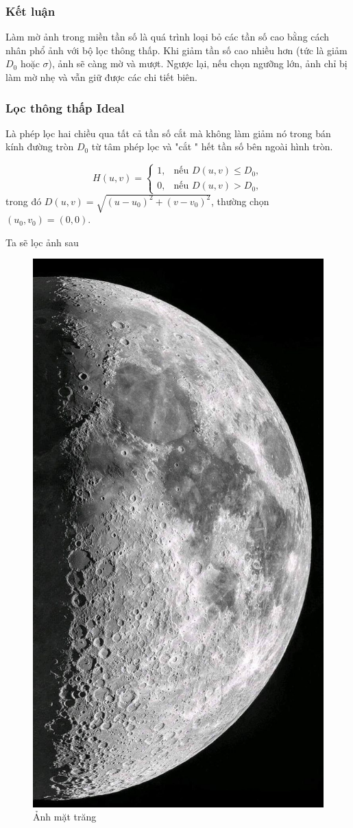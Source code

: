 \documentclass[12pt,a4paper]{report}
\numberwithin{equation}{section}
\theoremstyle{definition} %
\begin{document}
\subsubsection*{Kết luận}
Làm mờ ảnh trong miền tần số là quá trình loại bỏ các tần số cao bằng cách nhân phổ ảnh với bộ lọc thông thấp.  
Khi giảm tần số cao nhiều hơn (tức là giảm $D_0$ hoặc $\sigma$), ảnh sẽ càng mờ và mượt.  
Ngược lại, nếu chọn ngưỡng lớn, ảnh chỉ bị làm mờ nhẹ và vẫn giữ được các chi tiết biên.

\subsubsection{Lọc thông thấp Ideal}
Là phép lọc hai chiều qua tất cả tần số cắt mà không làm giảm nó trong bán kính đường tròn $D_0$ từ tâm phép lọc và "cắt " hết tần số bên ngoài hình tròn.

\begin{equation}
H(u,v) =
\begin{cases}
1, & \text{nếu } D(u,v) \le D_0, \\[4pt]
0, & \text{nếu } D(u,v) > D_0,
\end{cases}
\end{equation}
trong đó $D(u,v) = \sqrt{(u - u_0)^2 + (v - v_0)^2}$, thường chọn $(u_0, v_0) = (0,0).$

Ta sẽ lọc ảnh sau
\begin{figure}[H]
\centering
\includegraphics[width=0.4\linewidth]{img/moon.jpg}
\caption{Ảnh mặt trăng}
\label{fig111}
\end{figure}
\end{document}
